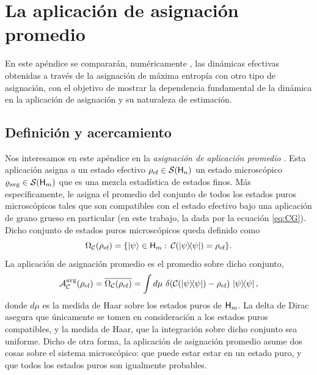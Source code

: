\chapter{La aplicación de asignación promedio}

En este apéndice se compararán, numéricamente , las dinámicas efectivas obtenidas a través de la asignación de máxima entropía con otro tipo de asignación, con el objetivo de mostrar la dependencia fundamental de la dinámica en la aplicación de asignación y su naturaleza de estimación.

\section{Definición y acercamiento}




Nos interesamos en este apéndice en la \textit{asignación de aplicación promedio} \cite{Macro-To-Micro}. Esta aplicación asigna a un estado efectivo $\rho_{\text{ef}} \in \mathcal{S}({\sf H}_{n})$ un estado microscópico $\varrho_{\text{avg}} \in \mathcal{S}({\sf H}_{m})$ que es una mezcla estadística de estados finos. Más específicamente, le asigna el promedio del conjunto de todos los estados puros microscópicos tales que son compatibles con el estado efectivo bajo una aplicación de grano grueso en particular (en este trabajo, la dada por la ecuación \ref{eq:CG}). Dicho conjunto de estados puros microscópicos queda definido como
\begin{equation}\label{eq:Omega}
    \Omega_{\mcC}(\rho_{\ef}) = \{\ket{\psi}\in\hilbert_{m}:\, \mcC(\dyad{\psi}) = \rho_{\ef}  \}.
\end{equation}
La aplicación de asignación promedio es el promedio sobre dicho conjunto, \ie 
\begin{equation}\label{eq:AvgMap}
    \mcA_{\mcC}^{\avg}(\rho_{\ef}) = \overline{\Omega_{\mcC}(\rho_{\ef})} = \int d \mu\,\, \delta(\mcC(\dyad{\psi})-\rho_{\ef})\,\dyad{\psi},
\end{equation}
donde $d\mu$ es la medida de Haar sobre los estados puros de ${\sf H}_{m}$. La delta de Dirac asegura que únicamente se tomen en consideración a los estados puros compatibles, y la medida de Haar, que la integración sobre dicho conjunto sea uniforme. Dicho de otra forma, la aplicación de asignación promedio asume dos cosas sobre el sistema microscópico: que puede estar estar en un estado puro, y que todos los estados puros son igualmente probables.


